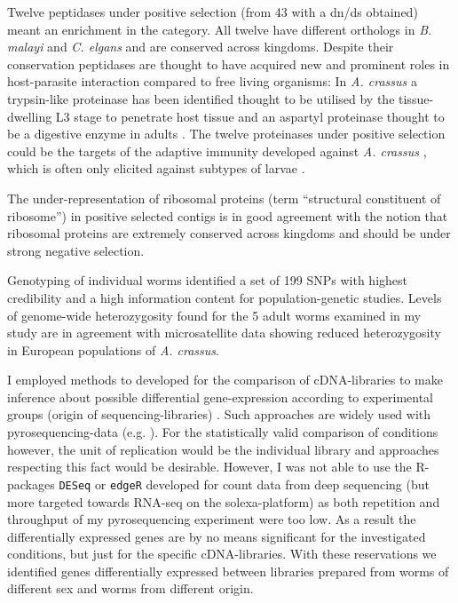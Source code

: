 Twelve peptidases under positive selection (from 43 with a dn/ds
obtained) meant an enrichment in the category. All twelve have different
orthologs in \textit{B. malayi} and \textit{C. elgans} and are
conserved across kingdoms. Despite their conservation peptidases are
thought to have acquired new and prominent roles in host-parasite
interaction compared to free living organisms: In \textit{A. crassus}
a trypsin-like proteinase has been identified thought to be utilised
by the tissue-dwelling L3 stage to penetrate host tissue and an
aspartyl proteinase thought to be a digestive enzyme in adults
\cite{polzer_identification_1993}. The twelve proteinases under positive
selection could be the targets of the adaptive immunity developed
against \textit{A. crassus} \cite{knopf_migratory_2008,
  knopf_vaccination_2008}, which is often only elicited against
subtypes of larvae \cite{molnar_caps}.

The under-representation of ribosomal proteins (term ``structural
constituent of ribosome'') in positive selected contigs is in good
agreement with the notion that ribosomal proteins are extremely
conserved across kingdoms \cite{pmid9664699} and should be under
strong negative selection.

Genotyping of individual worms identified a set of 199 SNPs with
highest credibility and a high information content for
population-genetic studies. Levels of genome-wide heterozygosity found
for the 5 adult worms examined in my study are in agreement with
microsatellite data \cite{wielgoss_population_2008} showing reduced
heterozygosity in European populations of \textit{A. crassus}.

I employed methods to developed for the comparison of cDNA-libraries
to make inference about possible differential gene-expression
according to experimental groups (origin of sequencing-libraries)
\cite{pmid9331369}. Such approaches are widely used with
pyrosequencing-data (e.g. \cite{pmid20470405}). For the statistically
valid comparison of conditions however, the unit of replication would
be the individual library and approaches respecting this fact would be
desirable. However, I was not able to use the R-packages
\texttt{DESeq} \cite{pmid20979621} or \texttt{edgeR}
\cite{pmid19910308} developed for count data from deep sequencing (but
more targeted towards RNA-seq on the solexa-platform) as both
repetition and throughput of my pyrosequencing experiment were too
low. As a result the differentially expressed genes are by no means
significant for the investigated conditions, but just for the specific
cDNA-libraries. With these reservations we identified genes
differentially expressed between libraries prepared from worms of
different sex and worms from different origin.

